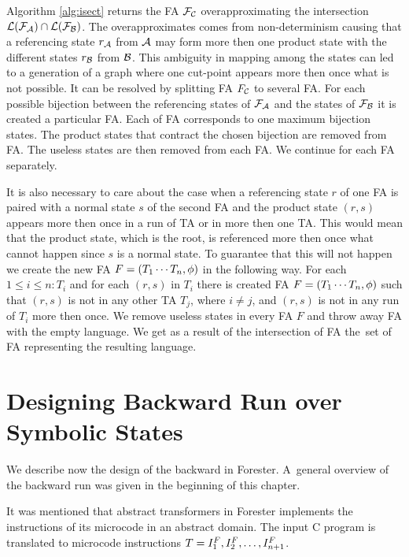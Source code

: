 Algorithm \ref{alg:isect} returns the FA $\mathcal{F}_{\mathcal{C}}$ overapproximating
the intersection $\mathcal{L}(\mathcal{F}_{\mathcal{A}}) \cap \mathcal{L}(\mathcal{F}_{\mathcal{B}})$.
The overapproximates comes from non-determinism causing that a referencing state $r_{\mathcal{A}}$ from $\mathcal{A}$
may form more then one product state with the different states $r_{\mathcal{B}}$ from $\mathcal{B}$.
This ambiguity in mapping among the states
can led to a generation of a graph where one cut-point appears more then once
what is not possible.
It can be resolved by splitting FA $F_{\mathcal{C}}$ to several FA.
For each possible bijection between the referencing states of $\mathcal{F}_{\mathcal{A}}$ and the states of $\mathcal{F}_{\mathcal{B}}$
it is created a particular FA.
Each of FA corresponds to one maximum bijection states.
The product states that contract the chosen bijection are
removed from FA.
The useless states are then removed from each FA.
We continue for each FA separately.

It is also necessary to care about the case when a referencing state $r$ of one FA
is paired with a normal state $s$ of the second FA and the product state $(r,s)$ appears
more then once in a run of TA or in more then one TA.
This would mean that the product state, which is the root,
is referenced more then once what cannot happen since $s$ is a normal state.
To guarantee that this will not happen we create the new FA $F=(T_1 \cdots T_n, \phi)$
in the following way.
For each $1 \leq i \leq n: T_i$
and for each $(r,s)$ in $T_i$
there is created FA $F=(T_1 \cdots T_n, \phi)$
such that $(r,s)$ is not in any other TA $T_{j}$, where $i \neq j$,
and $(r,s)$ is not in any run of $T_i$ more then once.
We remove useless states in every FA $F$ and throw away FA with the empty language.
We get as a result of the intersection of FA the~set of FA representing
the resulting language.

\section{Designing Backward Run over Symbolic States}
\label{sec:brdesign}

We describe now the design of the backward in Forester.
A~general overview of the backward run was given in the beginning of this chapter.

It was mentioned that abstract
transformers in Forester implements the instructions of its microcode in an abstract domain.
The input C program is translated to
microcode instructions $T=I_{1}^{F}, I_{2}^{F},\ldots, I_{n+1}^{F}$.

